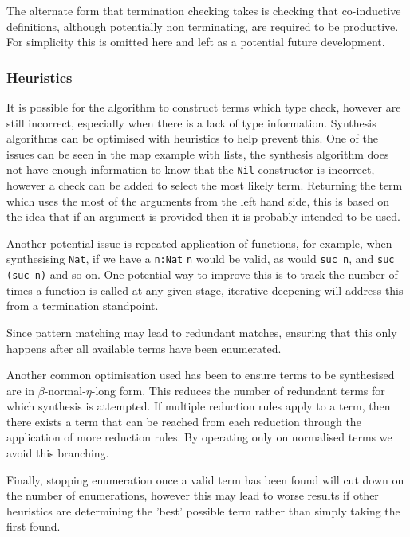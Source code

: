\documentclass[a4paper]{article}
\begin{document}
The alternate form that termination checking takes is checking that co-inductive definitions, although potentially non 
terminating, are required to be productive. For simplicity this is omitted here and left as a potential future development.
\subsubsection{Heuristics}
\label{sec:org83058a8}
It is possible for the algorithm to construct terms which type check, however are still incorrect, especially 
when there is a lack of type information. Synthesis algorithms can be optimised with heuristics to help prevent this.
One of the issues can be seen in the map example with lists, the synthesis algorithm does not have enough information to 
know that the \texttt{Nil} constructor is incorrect, however a check can be added to select the most likely term.
Returning the term which uses the most of the arguments from the left hand side, this is based on the idea that 
if an argument is provided then it is probably intended to be used. 

Another potential issue is repeated application of functions, for example, when synthesising \texttt{Nat}, if we have a \texttt{n:Nat}
\texttt{n} would be valid, as would \texttt{suc n}, and \texttt{suc (suc n)} and so on. One potential way to improve this is to track the number 
of times a function is called at any given stage, iterative deepening will address this from a termination standpoint.

Since pattern matching may lead to redundant matches, ensuring that this only happens after all available terms 
have been enumerated. 

Another common optimisation used has been to ensure terms to be synthesised are in \(\beta\)-normal-\(\eta\)-long form. This 
reduces the number of redundant terms for which synthesis is attempted. If multiple reduction rules apply to a term,
then there exists a term that can be reached from each reduction through the application of more reduction rules. \cite{10.5555/2788232}
By operating only on normalised terms we avoid this branching.

Finally, stopping enumeration once a valid term has been found will cut down on the 
number of enumerations, however this may lead to worse results if other heuristics are determining the 'best' possible
term rather than simply taking the first found. 
\end{document}

